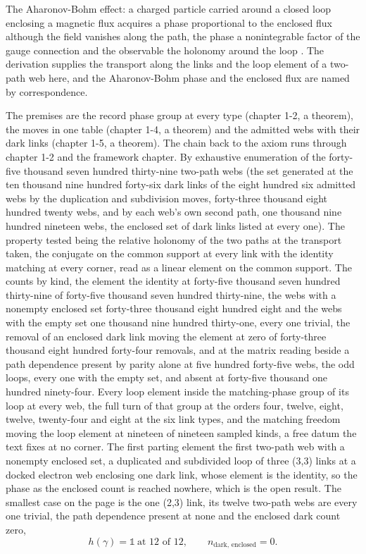 \begin{chbridge}
The Aharonov-Bohm effect: a charged particle carried around a closed loop enclosing a magnetic flux acquires a phase proportional to the enclosed flux although the field vanishes along the path, the phase a nonintegrable factor of the gauge connection and the observable the holonomy around the loop \cite{Aharonov1959,WuYang1975}. The derivation supplies the transport along the links and the loop element of a two-path web here, and the Aharonov-Bohm phase and the enclosed flux are named by correspondence.
\end{chbridge}
\begin{chproof}[census]
The premises are the record phase group at every type (chapter 1-2, a theorem), the moves in one table (chapter 1-4, a theorem) and the admitted webs with their dark links (chapter 1-5, a theorem). The chain back to the axiom runs through chapter 1-2 and the framework chapter. By exhaustive enumeration of the forty-five thousand seven hundred thirty-nine two-path webs (the set generated at the ten thousand nine hundred forty-six dark links of the eight hundred six admitted webs by the duplication and subdivision moves, forty-three thousand eight hundred twenty webs, and by each web's own second path, one thousand nine hundred nineteen webs, the enclosed set of dark links listed at every one). The property tested being the relative holonomy of the two paths at the transport taken, the conjugate on the common support at every link with the identity matching at every corner, read as a linear element on the common support. The counts by kind, the element the identity at forty-five thousand seven hundred thirty-nine of forty-five thousand seven hundred thirty-nine, the webs with a nonempty enclosed set forty-three thousand eight hundred eight and the webs with the empty set one thousand nine hundred thirty-one, every one trivial, the removal of an enclosed dark link moving the element at zero of forty-three thousand eight hundred forty-four removals, and at the matrix reading beside a path dependence present by parity alone at five hundred forty-five webs, the odd loops, every one with the empty set, and absent at forty-five thousand one hundred ninety-four. Every loop element inside the matching-phase group of its loop at every web, the full turn of that group at the orders four, twelve, eight, twelve, twenty-four and eight at the six link types, and the matching freedom moving the loop element at nineteen of nineteen sampled kinds, a free datum the text fixes at no corner. The first parting element the first two-path web with a nonempty enclosed set, a duplicated and subdivided loop of three (3,3) links at a docked electron web enclosing one dark link, whose element is the identity, so the phase as the enclosed count is reached nowhere, which is the open result. The smallest case on the page is the one (2,3) link, its twelve two-path webs are every one trivial, the path dependence present at none and the enclosed dark count zero,
\begin{equation}
h(\gamma) = \mathbb{1}\ \text{at } 12 \text{ of } 12,\qquad n_{\text{dark, enclosed}} = 0 .
\end{equation}


\end{chproof}
